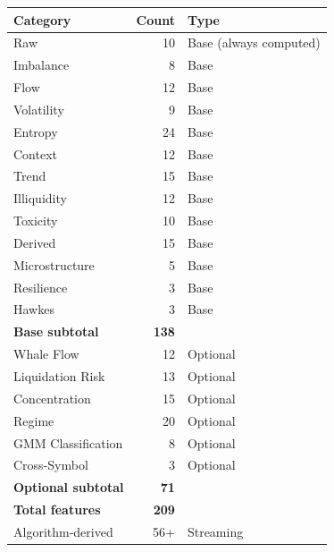 \documentclass[11pt,a4paper]{article}
\begin{document}
\begin{center}
\begin{tabular}{l r l}
\hline
\textbf{Category} & \textbf{Count} & \textbf{Type} \\
\hline
Raw & 10 & Base (always computed) \\
Imbalance & 8 & Base \\
Flow & 12 & Base \\
Volatility & 9 & Base \\
Entropy & 24 & Base \\
Context & 12 & Base \\
Trend & 15 & Base \\
Illiquidity & 12 & Base \\
Toxicity & 10 & Base \\
Derived & 15 & Base \\
Microstructure & 5 & Base \\
Resilience & 3 & Base \\
Hawkes & 3 & Base \\
\hline
\textbf{Base subtotal} & \textbf{138} & \\
\hline
Whale Flow & 12 & Optional \\
Liquidation Risk & 13 & Optional \\
Concentration & 15 & Optional \\
Regime & 20 & Optional \\
GMM Classification & 8 & Optional \\
Cross-Symbol & 3 & Optional \\
\hline
\textbf{Optional subtotal} & \textbf{71} & \\
\hline
\textbf{Total features} & \textbf{209} & \\
\hline
Algorithm-derived & 56+ & Streaming \\
\hline
\end{tabular}
\end{center}
\end{document}
